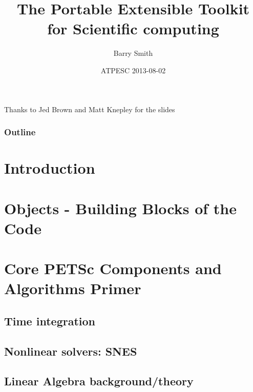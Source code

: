\documentclass{beamer}
\title[PETSc]{The Portable Extensible Toolkit for Scientific computing}
\author{Barry Smith}
\institute[ANL]{Mathematics and Computer Science Division, Argonne National Laboratory}
\date{ATPESC 2013-08-02}
\begin{document}
\lstset{language=C}

\begin{frame}
\titlepage
Thanks to Jed Brown and Matt Knepley for the slides
\end{frame}

\begin{frame}
\frametitle{Outline}
\tableofcontents
\end{frame}


\section{Introduction}









\section{Objects - Building Blocks of the Code}



\section[Core/Algorithms]{Core PETSc Components and Algorithms Primer}
\subsection{Time integration}





\subsection{Nonlinear solvers: SNES}






\subsection{Linear Algebra background/theory}




\end{document}
